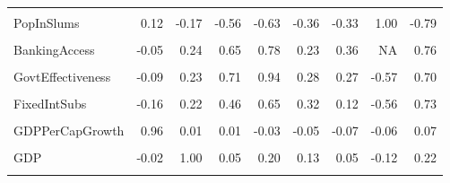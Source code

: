 \documentclass[
]{article}
\begin{document}
\begin{table}
{\begin{tabular}[t]{lrrrrrrrr}
\cellcolor{gray!10}{PopDensity} & \cellcolor{gray!10}{0.00} & \cellcolor{gray!10}{-0.02} & \cellcolor{gray!10}{0.14} & \cellcolor{gray!10}{0.18} & \cellcolor{gray!10}{-0.01} & \cellcolor{gray!10}{-0.15} & \cellcolor{gray!10}{-0.07} & \cellcolor{gray!10}{0.13}\\
PopInSlums & 0.12 & -0.17 & -0.56 & -0.63 & -0.36 & -0.33 & 1.00 & -0.79\\
\cellcolor{gray!10}{WaterStress} & \cellcolor{gray!10}{-0.01} & \cellcolor{gray!10}{-0.01} & \cellcolor{gray!10}{0.03} & \cellcolor{gray!10}{0.05} & \cellcolor{gray!10}{-0.02} & \cellcolor{gray!10}{0.06} & \cellcolor{gray!10}{-0.12} & \cellcolor{gray!10}{0.10}\\
BankingAccess & -0.05 & 0.24 & 0.65 & 0.78 & 0.23 & 0.36 & NA & 0.76\\
\addlinespace
\cellcolor{gray!10}{RnDInvest} & \cellcolor{gray!10}{-0.16} & \cellcolor{gray!10}{0.37} & \cellcolor{gray!10}{0.43} & \cellcolor{gray!10}{0.70} & \cellcolor{gray!10}{0.11} & \cellcolor{gray!10}{0.32} & \cellcolor{gray!10}{-0.23} & \cellcolor{gray!10}{0.54}\\
GovtEffectiveness & -0.09 & 0.23 & 0.71 & 0.94 & 0.28 & 0.27 & -0.57 & 0.70\\
\cellcolor{gray!10}{ShippingIndex} & \cellcolor{gray!10}{-0.01} & \cellcolor{gray!10}{0.53} & \cellcolor{gray!10}{0.09} & \cellcolor{gray!10}{0.39} & \cellcolor{gray!10}{0.16} & \cellcolor{gray!10}{-0.02} & \cellcolor{gray!10}{-0.27} & \cellcolor{gray!10}{0.46}\\
FixedIntSubs & -0.16 & 0.22 & 0.46 & 0.65 & 0.32 & 0.12 & -0.56 & 0.73\\
\cellcolor{gray!10}{InternetUsersPct} & \cellcolor{gray!10}{-0.16} & \cellcolor{gray!10}{0.19} & \cellcolor{gray!10}{0.41} & \cellcolor{gray!10}{0.57} & \cellcolor{gray!10}{0.38} & \cellcolor{gray!10}{0.17} & \cellcolor{gray!10}{-0.76} & \cellcolor{gray!10}{0.82}\\
\addlinespace
GDPPerCapGrowth & 0.96 & 0.01 & 0.01 & -0.03 & -0.05 & -0.07 & -0.06 & 0.07\\
\cellcolor{gray!10}{GDPGrowth} & \cellcolor{gray!10}{1.00} & \cellcolor{gray!10}{-0.02} & \cellcolor{gray!10}{-0.06} & \cellcolor{gray!10}{-0.12} & \cellcolor{gray!10}{-0.11} & \cellcolor{gray!10}{-0.11} & \cellcolor{gray!10}{0.14} & \cellcolor{gray!10}{-0.08}\\
GDP & -0.02 & 1.00 & 0.05 & 0.20 & 0.13 & 0.05 & -0.12 & 0.22\\
\cellcolor{gray!10}{PoliticalStability} & \cellcolor{gray!10}{-0.06} & \cellcolor{gray!10}{0.05} & \cellcolor{gray!10}{1.00} & \cellcolor{gray!10}{0.78} & \cellcolor{gray!10}{0.20} & \cellcolor{gray!10}{0.33} & \cellcolor{gray!10}{-0.45} & \cellcolor{gray!10}{0.51}\\

\end{tabular}}
\end{table}
\end{document}
